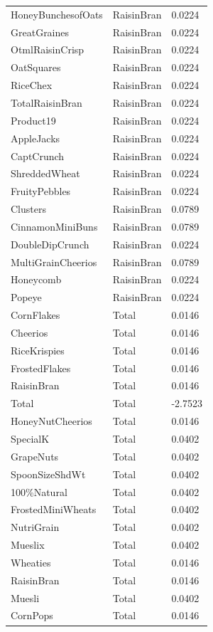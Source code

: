 \begin{table}[!htbp]
\begin{tabular}{lll}
\\
HoneyBunchesofOats & RaisinBran & 0.0224
\\
GreatGraines & RaisinBran & 0.0224
\\
OtmlRaisinCrisp & RaisinBran & 0.0224
\\
OatSquares & RaisinBran & 0.0224
\\
RiceChex & RaisinBran & 0.0224
\\
TotalRaisinBran & RaisinBran & 0.0224
\\
Product19 & RaisinBran & 0.0224
\\
AppleJacks & RaisinBran & 0.0224
\\
CaptCrunch & RaisinBran & 0.0224
\\
ShreddedWheat & RaisinBran & 0.0224
\\
FruityPebbles & RaisinBran & 0.0224
\\
Clusters & RaisinBran & 0.0789
\\
CinnamonMiniBuns & RaisinBran & 0.0789
\\
DoubleDipCrunch & RaisinBran & 0.0224
\\
MultiGrainCheerios & RaisinBran & 0.0789
\\
Honeycomb & RaisinBran & 0.0224
\\
Popeye & RaisinBran & 0.0224
\\
CornFlakes & Total & 0.0146
\\
Cheerios & Total & 0.0146
\\
RiceKrispies & Total & 0.0146
\\
FrostedFlakes & Total & 0.0146
\\
RaisinBran & Total & 0.0146
\\
Total & Total & -2.7523
\\
HoneyNutCheerios & Total & 0.0146
\\
SpecialK & Total & 0.0402
\\
GrapeNuts & Total & 0.0402
\\
SpoonSizeShdWt & Total & 0.0402
\\
100\%Natural & Total & 0.0402
\\
FrostedMiniWheats & Total & 0.0402
\\
NutriGrain & Total & 0.0402
\\
Mueslix & Total & 0.0402
\\
Wheaties & Total & 0.0146
\\
RaisinBran & Total & 0.0146
\\
Muesli & Total & 0.0402
\\
CornPops & Total & 0.0146

\end{tabular}
\end{table}
